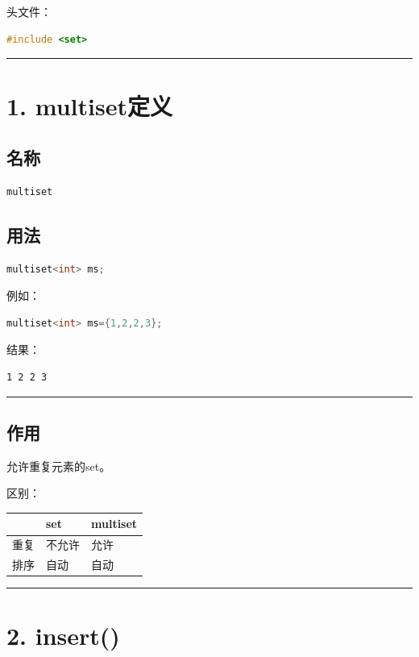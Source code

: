 \documentclass[10pt,twocolumn]{extarticle}
\begin{document}
头文件：
\begin{lstlisting}[language=C++]
#include <set>
\end{lstlisting}

\noindent\rule{\linewidth}{0.4pt}

\section{1. multiset定义}

\subsection{名称}
\begin{lstlisting}[language=C++]
multiset
\end{lstlisting}

\subsection{用法}
\begin{lstlisting}[language=C++]
multiset<int> ms;
\end{lstlisting}
例如：
\begin{lstlisting}[language=C++]
multiset<int> ms={1,2,2,3};
\end{lstlisting}
结果：
\begin{lstlisting}
1 2 2 3
\end{lstlisting}

\noindent\rule{\linewidth}{0.4pt}

\subsection{作用}
允许重复元素的set。

区别：
\begin{table}[h]
\centering
\begin{tabular}{|l|l|l|}
\hline
 & set & multiset \\ \hline
重复 & 不允许 & 允许 \\ \hline
排序 & 自动 & 自动 \\ \hline
\end{tabular}
\end{table}

\noindent\rule{\linewidth}{0.4pt}

\section{2. insert()}
\end{document}
